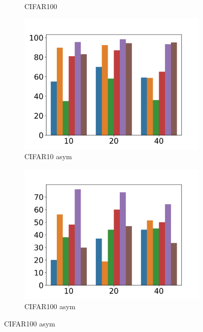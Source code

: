 \documentclass{article}
\begin{document}
\begin{figure}[h]
\begin{subfigure}[b]{0.22\textwidth}
        \vspace{-.5cm}
        \caption{CIFAR100}
    \end{subfigure}
    \begin{subfigure}[b]{0.22\textwidth}
        \includegraphics[width=\textwidth]{figs/c10apbar.png}
        \vspace{-.5cm}
        \caption{CIFAR10 asym}
    \end{subfigure}
    \begin{subfigure}[b]{0.22\textwidth}
        \includegraphics[width=\textwidth]{figs/c100apbar.png}
        \vspace{-.5cm}
        \caption{CIFAR100 asym}
    \end{subfigure}

\end{figure}
\end{document}
